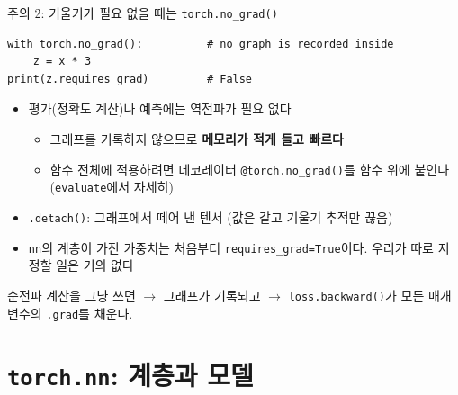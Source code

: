 \documentclass[aspectratio=169,11pt]{beamer}
\newcommand{\code}[1]{\texttt{#1}}
\begin{document}
\begin{frame}[fragile]{주의 2: 기울기가 필요 없을 때는 \code{torch.no\_grad()}}
\begin{lstlisting}
with torch.no_grad():          # no graph is recorded inside
    z = x * 3
print(z.requires_grad)         # False
\end{lstlisting}
\begin{itemize}
\item 평가(정확도 계산)나 예측에는 역전파가 필요 없다
\begin{itemize}
\item 그래프를 기록하지 않으므로 \textbf{메모리가 적게 들고 빠르다}
\item 함수 전체에 적용하려면 데코레이터 \code{@torch.no\_grad()}를 함수 위에 붙인다 (\code{evaluate}에서 자세히)
\end{itemize}
\item \code{.detach()}: 그래프에서 떼어 낸 텐서 (값은 같고 기울기 추적만 끊음)
\item \code{nn}의 계층이 가진 가중치는 처음부터 \code{requires\_grad=True}이다. 우리가 따로 지정할 일은 거의 없다
\end{itemize}
\begin{keybox}[정리: 자동 미분]
순전파 계산을 그냥 쓰면 $\to$ 그래프가 기록되고 $\to$ \code{loss.backward()}가 모든 매개변수의 \code{.grad}를 채운다.
\end{keybox}
\end{frame}

\section{\texttt{torch.nn}: 계층과 모델}
\end{document}
